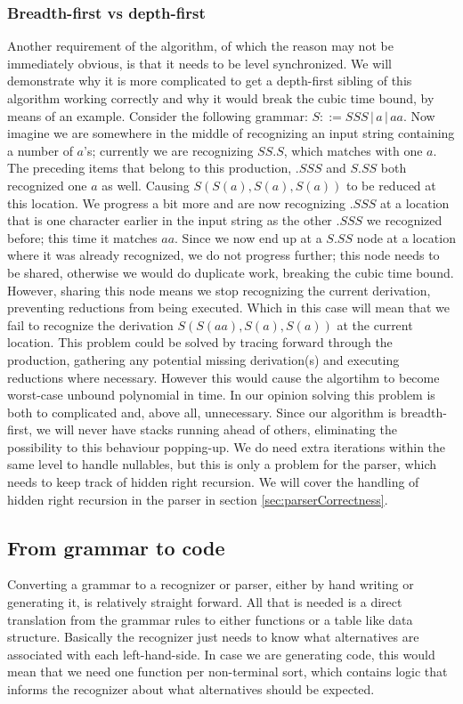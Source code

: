\documentclass[a4paper,10pt]{article}
\begin{document}
\subsubsection{Breadth-first vs depth-first}
Another requirement of the algorithm, of which the reason may not be immediately obvious, is that it needs to be level synchronized. We will demonstrate why it is more complicated to get a depth-first sibling of this algorithm working correctly and why it would break the cubic time bound, by means of an example. Consider the following grammar: $S ::= SSS\,|\,a\,|\,aa$. Now imagine we are somewhere in the middle of recognizing an input string containing a number of $a$'s; currently we are recognizing $SS.S$, which matches with one $a$. The preceding items that belong to this production, $.SSS$ and $S.SS$ both recognized one $a$ as well. Causing $S(S(a),S(a),S(a))$ to be reduced at this location. We progress a bit more and are now recognizing $.SSS$ at a location that is one character earlier in the input string as the other $.SSS$ we recognized before; this time it matches $aa$. Since we now end up at a $S.SS$ node at a location where it was already recognized, we do not progress further; this node needs to be shared, otherwise we would do duplicate work, breaking the cubic time bound. However, sharing this node means we stop recognizing the current derivation, preventing reductions from being executed. Which in this case will mean that we fail to recognize the derivation $S(S(aa),S(a),S(a))$ at the current location. This problem could be solved by tracing forward through the production, gathering any potential missing derivation(s) and executing reductions where necessary. However this would cause the algortihm to become worst-case unbound polynomial in time. In our opinion solving this problem is both to complicated and, above all, unnecessary. Since our algorithm is breadth-first, we will never have stacks running ahead of others, eliminating the possibility to this behaviour popping-up. We do need extra iterations within the same level to handle nullables, but this is only a problem for the parser, which needs to keep track of hidden right recursion. We will cover the handling of hidden right recursion in the parser in section \ref{sec:parserCorrectness}.

\subsection{From grammar to code}

Converting a grammar to a recognizer or parser, either by hand writing or generating it, is relatively straight forward. All that is needed is a direct translation from the grammar rules to either functions or a table like data structure. Basically the recognizer just needs to know what alternatives are associated with each left-hand-side. In case we are generating code, this would mean that we need one function per non-terminal sort, which contains logic that informs the recognizer about what alternatives should be expected.
\end{document}
